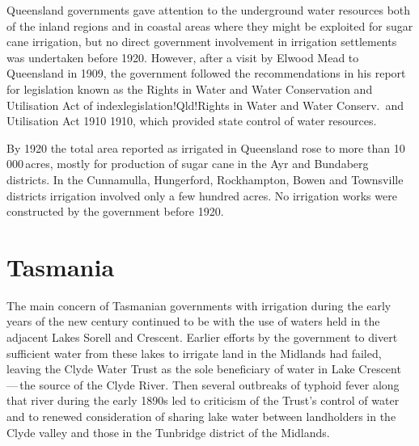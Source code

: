 Queensland governments gave attention to the underground water
resour\-ces both of the inland regions and in coastal areas where they
might be exploited for sugar cane irrigation, but no direct government
involvement in irrigation settlements was undertaken before 1920.
However, after a visit by Elwood Mead  to Queensland
in 1909, the government followed the recommendations in his report for
legislation known as the Rights in Water and Water Conservation and
Utilisation Act of index{legislation!Qld!Rights in Water and Water
Conserv.\ and Utilisation Act 1910} 1910, which provided state control
of water resources.

By 1920 the total area reported as irrigated in Queensland rose to
more than 10\,000\,acres, mostly for production of sugar cane in the
Ayr and Bundaberg districts.  In the Cunnamulla, Hungerford,
Rockhampton, Bowen and Townsville districts irrigation involved only a
few hundred acres.  No irrigation works were constructed by the
government before 1920.

\section*{Tasmania}

The main concern of Tasmanian governments with irrigation during the
early years of the new century continued to be with the use of waters
held in the adjacent Lakes Sorell  and Crescent.
 Earlier efforts by the government to divert
sufficient water from these lakes to irrigate land in the Midlands had
failed, leaving the Clyde Water Trust as the sole beneficiary of water
in Lake Crescent\,---\,the source of the Clyde
River.  Then several outbreaks of
typhoid fever along that river during the early 1890s
led to criticism of the Trust's control of water and to renewed
consideration of sharing lake water between landholders in the Clyde
valley and those in the Tunbridge district of the
Midlands.

